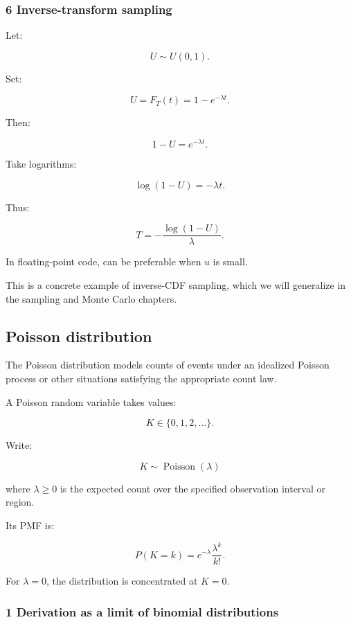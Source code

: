 \subsubsection{6 Inverse-transform sampling}\label{02-foundations-ii-ch024-inverse-transform-sampling}

\hypertarget{02-foundations-ii-ch024-inverse-transform-sampling}{}

Let:

\[
 U\sim U(0,1).
\]

Set:

\[
 U=F_T(t)=1-e^{-\lambda t}.
\]

Then:

\[
 1-U=e^{-\lambda t}.
\]

Take logarithms:

\[
 \log(1-U)=-\lambda t.
\]

Thus:

\[
 \boxed{ T=-\frac{\log(1-U)}{\lambda} }.
\]

In floating-point code,  can be preferable when \(u\) is small.

This is a concrete example of inverse-CDF sampling, which we will generalize in the sampling and Monte Carlo chapters.

\subsection{Poisson distribution}\label{02-foundations-ii-ch024-poisson-distribution}

\hypertarget{02-foundations-ii-ch024-poisson-distribution}{}

The Poisson distribution models counts of events under an idealized Poisson process or other situations satisfying the appropriate count law.

A Poisson random variable takes values:

\[
 K\in\{0,1,2,\ldots\}.
\]

Write:

\[
 \boxed{K\sim\operatorname{Poisson}(\lambda)}
\]

where \(\lambda\ge0\) is the expected count over the specified observation interval or region.

Its PMF is:

\[
 \boxed{ P(K=k)= e^{-\lambda}\frac{\lambda^k}{k!} }.
\]

For \(\lambda=0\), the distribution is concentrated at \(K=0\).

\subsubsection{1 Derivation as a limit of binomial distributions}\label{02-foundations-ii-ch024-derivation-as-a-limit-of-binomial-distributions}

